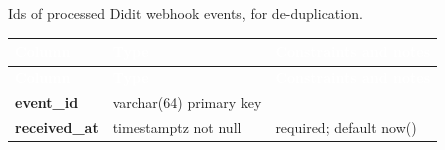 \subsection*{}
Ids of processed Didit webhook events, for de-duplication.\par\vspace{2pt}
{\tabfont\rowband
\begin{longtable}{@{}>{\raggedright\arraybackslash}p{}>{\raggedright\arraybackslash}p{}>{\raggedright\arraybackslash}p{}@{}}
\rowcolor{najdanavy}\textcolor{white}{\sffamily\bfseries\small Column} & \textcolor{white}{\sffamily\bfseries\small Type} & \textcolor{white}{\sffamily\bfseries\small Constraints and notes}\\
\endfirsthead
\rowcolor{najdanavy}\textcolor{white}{\sffamily\bfseries\small Column} & \textcolor{white}{\sffamily\bfseries\small Type} & \textcolor{white}{\sffamily\bfseries\small Constraints and notes}\\
\endhead
\bottomrule\endlastfoot
\textbf{event\_\allowbreak{}id} & varchar(64) primary key & \\
\textbf{received\_\allowbreak{}at} & timestamptz not null & required; default now()\\
\end{longtable}}


